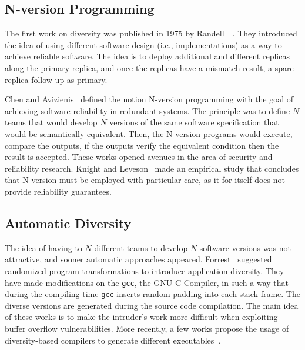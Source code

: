 \subsection{N-version Programming}
The first work on diversity was published in 1975 by Randell~\etal{}~\cite{Randell:1975}. 
They introduced the idea of using different software design (i.e., implementations) as a way to achieve reliable software. 
The idea is to deploy additional and different replicas along the primary replica, and once the replicas have a mismatch result, a spare replica follow up as primary.


Chen and Avizienis~\cite{Avizienis:1977,Chen:1978} defined the notion N-version programming with the goal of achieving software reliability in redundant systems.
The principle was to define $N$ teams that would develop $N$ versions of the same software specification that would be semantically equivalent.
Then, the N-version programs would execute, compare the outputs, if the outputs verify the equivalent condition then the result is accepted.
These works opened avenues in the area of security and reliability research.
Knight and Leveson~\cite{Knight:1986} made an empirical study that concludes that N-version must be employed with particular care, as it for itself does not provide reliability guarantees. 

\subsection{Automatic Diversity}  
The idea of having to $N$ different teams to develop $N$ software versions was not attractive, and sooner automatic approaches appeared.
Forrest~\cite{Forrest:1997} suggested randomized program transformations to introduce application diversity. 
They have made modifications on the \texttt{gcc}, the GNU C Compiler, in such a way that during the compiling time \texttt{gcc} inserts random padding
into each stack frame. 
The diverse versions are generated during the source code compilation. 
The main idea of these works is to make the intruder’s work more difficult when exploiting buffer overflow vulnerabilities.
More recently, a few works propose the usage of diversity-based compilers to generate different executables~\cite{Platania:2014,Roeder:2010,King:2016}.

